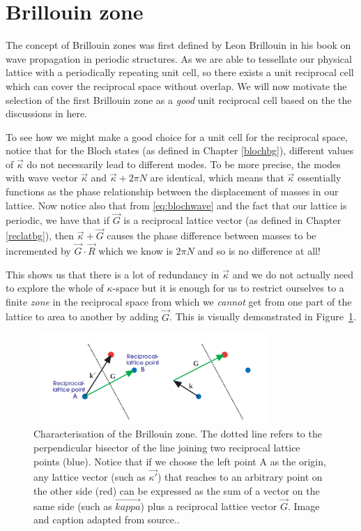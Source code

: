 \section{Brillouin zone}
\label{brizones}

The concept of Brillouin zones was first defined by Leon Brillouin in his book
on wave propagation in periodic structures.\cite{brillouin} As we are able to
tessellate our physical lattice with a periodically repeating unit cell, so
there exists a unit reciprocal cell which can cover the reciprocal space
without overlap. We will now motivate the selection of the first Brillouin zone
as a \textit{good} unit reciprocal cell based on the the discussions in
here.\cite{moldinglight}

To see how we might make a good choice for a unit cell for the reciprocal
space, notice that for the Bloch states (as defined in Chapter \ref{blochbg}),
different values of $\vec{\kappa}$ do not necessarily lead to different modes.
To be more precise, the modes with wave vector $\vec{\kappa}$ and
$\vec{\kappa}+2\pi N$ are identical, which means that $\vec{\kappa}$
essentially functions as the phase relationship between the displacement of
masses in our lattice. Now notice also that from \eqref{eq:blochwave} and the
fact that our lattice is periodic, we have that if $\vec{G}$ is a reciprocal
lattice vector (as defined in Chapter \ref{reclatbg}), then
$\vec{\kappa}+\vec{G}$ causes the phase difference between masses to be
incremented by $\vec{G}\cdot\vec{R}$ which we know is $2\pi N$ and so is no
difference at all!

This shows us that there is a lot of redundancy in $\vec{\kappa}$ and we do not
actually need to explore the whole of $\kappa$-space but it is enough for us to
restrict ourselves to a finite \textit{zone} in the reciprocal space from which
we \textit{cannot} get from one part of the lattice to area to another by
adding $\vec{G}$. This is visually demonstrated in Figure~\ref{fig:kappaspace}.

\begin{figure}[!h]
\centering
\includegraphics[width=0.8\textwidth]{imgs/kappaspace.PNG}
\caption{\label{fig:kappaspace} Characterisation of the Brillouin zone. The
  dotted line refers to the perpendicular bisector of the line joining two
  reciprocal lattice points (blue). Notice that if we choose the left point A
  as the origin, any lattice vector (such as $\vec{\kappa'}$) that reaches to
  an arbitrary point on the other side (red) can be expressed as the sum of a
  vector on the same side (such as $\vec{kappa}$) plus a reciprocal lattice
  vector $\vec{G}$. Image and caption adapted from source.\cite{moldinglight}.}
\end{figure}

